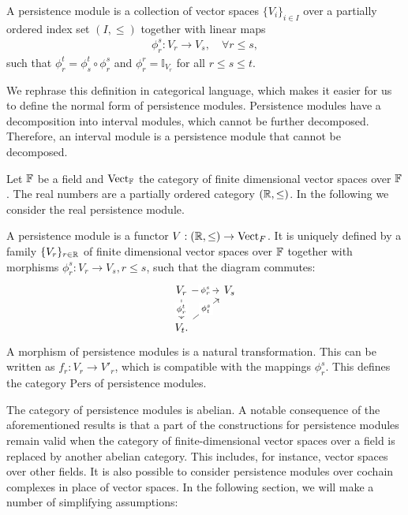 \begin{definition}{\cite[\S 1.1]{chazal2016structure}}
A persistence module is a collection of vector spaces $\{V_i\}_{i \in I}$ over a partially ordered index set $(I,\leq)$ together with linear maps
\begin{align}
\phi_{r}^{s}: V_r \rightarrow V_s, \quad \forall r \leq s,
\end{align}
such that $\phi_{r}^{t} = \phi^{t}_{s} \circ \phi_{r}^{s}$ and $\phi_{r}^r = \mathbb{I}_{V_r}$ for all $r \leq s \leq t$.
\end{definition}

We rephrase this definition in categorical language, which makes it easier for us to define the normal form of persistence modules. Persistence modules have a decomposition into interval modules, which cannot be further decomposed. Therefore, an interval module is a persistence module that cannot be decomposed.

Let ${\mathbb{F}}$ be a field and $\text{Vect}_{\mathbb{F}}$ the category of finite dimensional vector spaces over ${\mathbb{F}}$. The real numbers are a partially ordered category $({\mathbb{R}}, \leq)$. In the following we consider the real persistence module.

\begin{definition}{\cite[\S 1.3]{chazal2016structure}}
A persistence module is a functor $V: ({\mathbb{R}},\leq) \rightarrow \text{Vect}_F$. It is uniquely defined by a family $\{V_r\}_{r\in{\mathbb{R}}}$ of finite dimensional vector spaces over ${\mathbb{F}}$ together with morphisms $\phi_{r}^{s}: V_r \rightarrow V_s, r \leq s$, such that the diagram commutes:
\begin{equation}
\begin{tikzcd}
V_r \arrow[d, "{\phi_{r}^{t}}" description] \arrow[r, "{\phi_{r}^{s}}" description] & V_s \\
V_t. \arrow[ru, "{\phi_{t}^{s}}" description]                                      &    
\end{tikzcd}
\end{equation}
A morphism of persistence modules is a natural transformation. This can be written as $f_r: V_r \rightarrow V'_r$, which is compatible with the mappings $\phi_{r}^{s}$. This defines the category $\mathrm{Pers}$ of persistence modules.
\end{definition}

The category of persistence modules is abelian. A notable consequence of the aforementioned results is that a part of the constructions for persistence modules remain valid when the category of finite-dimensional vector spaces over a field is replaced by another abelian category. This includes, for instance, vector spaces over other fields. It is also possible to consider persistence modules over cochain complexes in place of vector spaces. In the following section, we will make a number of simplifying assumptions:


